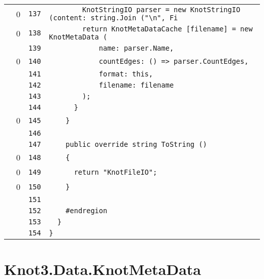 \documentclass[a4paper,10pt]{article}
\begin{document}
\begin{longtable}[l]{lrrl}
\cellcolor{red} & 0 & \verb~137~ & \verb~        KnotStringIO parser = new KnotStringIO (content: string.Join ("\n", Fi~\\
\cellcolor{red} & 0 & \verb~138~ & \verb~        return KnotMetaDataCache [filename] = new KnotMetaData (~\\
\cellcolor{gray} &  & \verb~139~ & \verb~            name: parser.Name,~\\
\cellcolor{red} & 0 & \verb~140~ & \verb~            countEdges: () => parser.CountEdges,~\\
\cellcolor{gray} &  & \verb~141~ & \verb~            format: this,~\\
\cellcolor{gray} &  & \verb~142~ & \verb~            filename: filename~\\
\cellcolor{gray} &  & \verb~143~ & \verb~        );~\\
\cellcolor{gray} &  & \verb~144~ & \verb~      }~\\
\cellcolor{red} & 0 & \verb~145~ & \verb~    }~\\
\cellcolor{gray} &  & \verb~146~ & \verb~~\\
\cellcolor{gray} &  & \verb~147~ & \verb~    public override string ToString ()~\\
\cellcolor{red} & 0 & \verb~148~ & \verb~    {~\\
\cellcolor{red} & 0 & \verb~149~ & \verb~      return "KnotFileIO";~\\
\cellcolor{red} & 0 & \verb~150~ & \verb~    }~\\
\cellcolor{gray} &  & \verb~151~ & \verb~~\\
\cellcolor{gray} &  & \verb~152~ & \verb~    #endregion~\\
\cellcolor{gray} &  & \verb~153~ & \verb~  }~\\
\cellcolor{gray} &  & \verb~154~ & \verb~}~\\
\end{longtable}
\newpage
\section{Knot3.Data.KnotMetaData}
\end{document}
